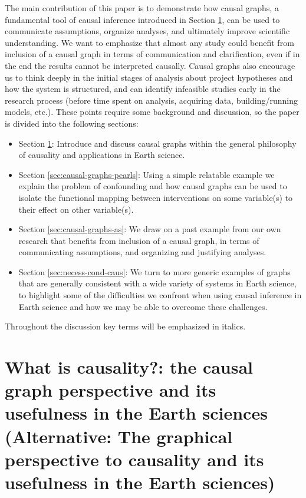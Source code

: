 \documentclass[12pt]{article}
\begin{document}
The main contribution of this paper is to demonstrate how causal
graphs, a fundamental tool of causal inference introduced in Section
\ref{sec:what-caus-caus}, can be used to communicate assumptions,
organize analyses, and ultimately improve scientific understanding. We
want to emphasize that almost any study could benefit from inclusion
of a causal graph in terms of communication and clarification, even if
in the end the results cannot be interpreted causally. Causal graphs
also encourage us to think deeply in the initial stages of analysis
about project hypotheses and how the system is structured, and can
identify infeasible studies early in the research process (before time
spent on analysis, acquiring data, building/running models,
etc.). These points require some background and discussion, so the
paper is divided into the following sections:

\begin{itemize}
\item Section \ref{sec:what-caus-caus}: Introduce and discuss causal
  graphs within the general philosophy of causality and applications
  in Earth science.
\item Section \ref{sec:causal-graphs-pearls}: Using a simple relatable
  example we explain the problem of confounding and how causal graphs
  can be used to isolate the functional mapping between interventions
  on some variable(s) to their effect on other variable(s).
\item Section \ref{sec:causal-graphs-as}: We draw on a past example
  from our own research that benefits from inclusion of a causal
  graph, in terms of communicating assumptions, and organizing and
  justifying analyses.
\item Section \ref{sec:necess-cond-caus}: We turn to more generic
  examples of graphs that are generally consistent with a wide variety
  of systems in Earth science, to highlight some of the difficulties
  we confront when using causal inference in Earth science and how we
  may be able to overcome these challenges.
\end{itemize}

Throughout the discussion key terms will be emphasized in italics.

\section{What is causality?: the causal graph perspective and its
  usefulness in the Earth sciences (Alternative: The graphical
  perspective to causality and its usefulness in the Earth
  sciences)}\label{sec:what-caus-caus}
\end{document}
